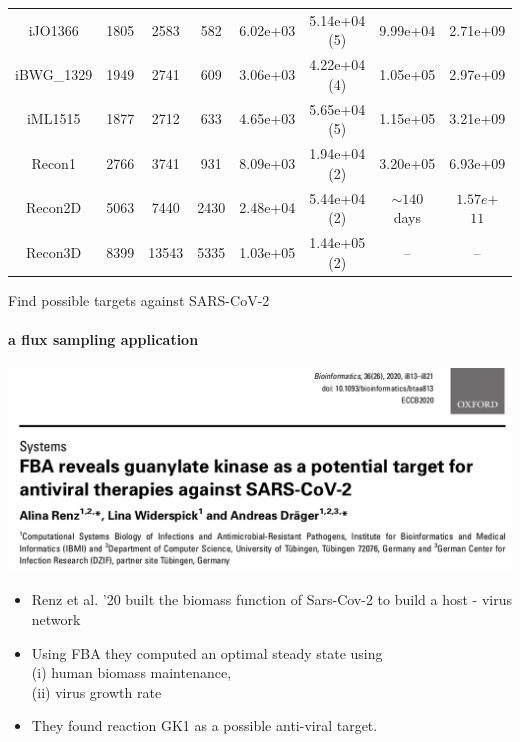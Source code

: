 \documentclass{beamer}
\begin{document}
\begin{frame}
\begin{table}[]
{\begin{tabular}{|c||c|c|c||c|c||c|c|}
               iJO1366  & 1805 & 2583 & 582 & 6.02e+03 & 5.14e+04 (5)  & 9.99e+04  & 2.71e+09 \\
               iBWG\_1329 & 1949 & 2741 & 609 & 3.06e+03 & 4.22e+04 (4) & 1.05e+05   & 2.97e+09 \\
               iML1515 & 1877 & 2712 & 633 &  4.65e+03 & 5.65e+04 (5)  & 1.15e+05   & 3.21e+09 \\
               Recon1 & 2766 & 3741 & 931 & 8.09e+03 & 1.94e+04 (2) & 3.20e+05  & 6.93e+09 \\
               Recon2D & 5063 & 7440 & 2430 & 2.48e+04  &  5.44e+04 (2)  & $\sim 140$ days & $1.57e$+$11$   \\
               Recon3D  & 8399 & 13543 & 5335 & 1.03e+05 &  1.44e+05 (2) & -- & -- \\
               \hline
               \end{tabular}%
         }
      \end{table}
   
   \end{frame}

   \begin{frame}{Find possible targets against SARS-CoV-2}
      \framesubtitle{a flux sampling application}
      \bigskip
      \includegraphics[scale=0.27]{ ../met_nets/resources//covid_paper.png}
      
      \begin{singlespace}
         \begin{itemize}
            \item \small Renz et al. '20 built the biomass function of Sars-Cov-2 to build a host - virus network
            \item \small Using FBA they computed an optimal steady state using \\ \small \quad (i) human biomass maintenance,\\ \small \quad (ii) virus growth rate
            \item \small They found reaction GK1 as a possible anti-viral target.
         \end{itemize}            
      \end{singlespace}

   \end{frame}
\end{document}
